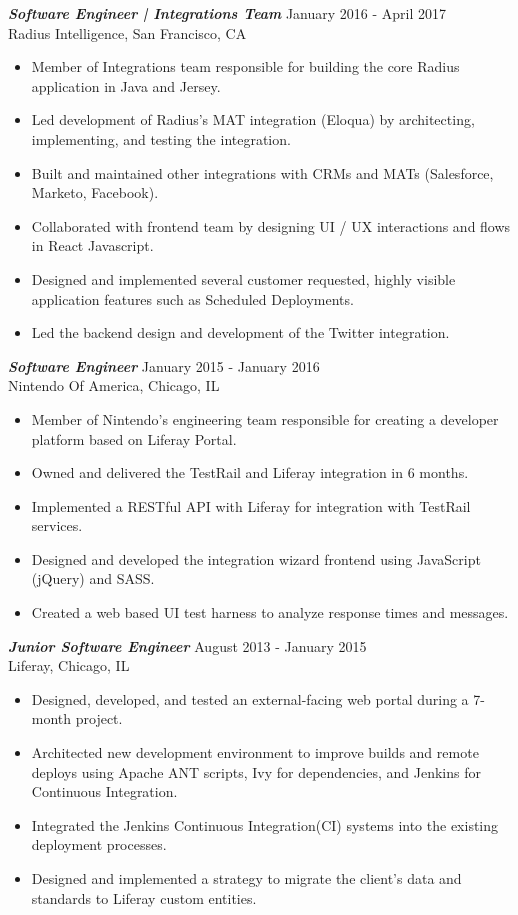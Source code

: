 \documentclass[overlapped, 10pt]{res} %
\begin{document}
\begin{resume}
{\sl \textbf{Software Engineer | Integrations Team}} \hfill January 2016 - April 2017 \\
Radius Intelligence, San Francisco, CA
\begin{itemize} \itemsep -2pt %
\item Member of Integrations team responsible for building the core Radius application in Java and Jersey.
\item Led development of Radius’s MAT integration (Eloqua) by architecting, implementing, and testing the integration.
\item Built and maintained other integrations with CRMs and MATs (Salesforce, Marketo, Facebook).
\item Collaborated with frontend team by designing UI / UX interactions and flows in React Javascript.
\item Designed and implemented several customer requested, highly visible application features such as Scheduled Deployments.
\item Led the backend design and development of the Twitter integration.
\end{itemize}
 
{\sl \textbf{Software Engineer}} \hfill January 2015 - January 2016 \\
Nintendo Of America, Chicago, IL
\begin{itemize} 
\item Member of Nintendo’s engineering team responsible for creating a developer platform based on Liferay Portal.
\item Owned and delivered the TestRail and Liferay integration in 6 months.
\item Implemented a RESTful API with Liferay for integration with TestRail services.
\item Designed and developed the integration wizard frontend using JavaScript (jQuery) and SASS.
\item Created a web based UI test harness to analyze response times and messages.
\end{itemize} 

{\sl \textbf{Junior Software Engineer}} \hfill August 2013 - January 2015 \\
Liferay, Chicago, IL
\begin{itemize} 
\item Designed, developed, and tested an external-facing web portal during a 7-month project.
\item Architected new development environment to improve builds and remote deploys using Apache ANT scripts, Ivy for dependencies, and Jenkins for Continuous Integration.
\item Integrated the Jenkins Continuous Integration(CI) systems into the existing deployment processes.
\item Designed and implemented a strategy to migrate the client’s data and standards to Liferay custom entities.
\end{itemize} 


\end{resume}
\end{document}
